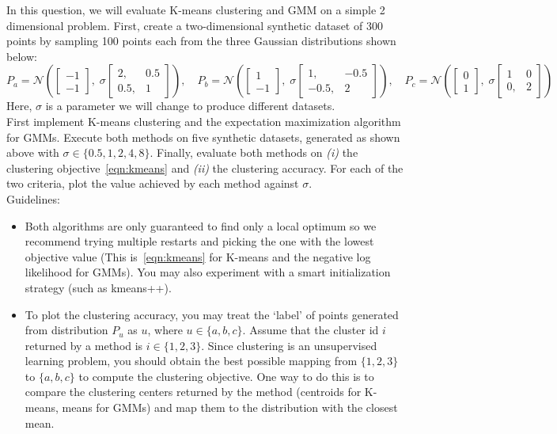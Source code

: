 \documentclass[a4paper]{article}
\newcounter{thm}
\newcommand{\Ncal}{\mathcal{N}}
\theoremstyle{definition}
\begin{document}
In this question, we will evaluate
K-means clustering and GMM on a simple 2 dimensional problem.
First, create a two-dimensional synthetic dataset of 300 points by sampling 100 points each from the
three Gaussian distributions shown below:
\[
P_a = \Ncal\left(
\begin{bmatrix}
-1 \\ -1
\end{bmatrix},
\;
\sigma\begin{bmatrix}
2, &0.5 \\ 0.5, &1
\end{bmatrix}
\right),
\quad
P_b = \Ncal\left(
\begin{bmatrix}
1 \\ -1
\end{bmatrix},
\;
 \sigma\begin{bmatrix}
1, &-0.5 \\ -0.5, &2
\end{bmatrix}
\right),
\quad
P_c = \Ncal\left(
\begin{bmatrix}
0 \\ 1
\end{bmatrix},
\;
 \sigma\begin{bmatrix}
1 &0 \\ 0, &2
\end{bmatrix}
\right)
\]
Here, $\sigma$ is a parameter we will change to produce different datasets.\\

First implement K-means clustering and the expectation maximization algorithm for GMMs.
Execute both methods on five synthetic datasets,
generated as shown above with $\sigma \in \{0.5, 1, 2, 4, 8\}$. Finally, evaluate both methods on \emph{(i)} the clustering objective~\eqref{eqn:kmeans} and \emph{(ii)}  the clustering accuracy. For each of the two criteria, plot the value achieved by each method against $\sigma$.\\


Guidelines:
\begin{itemize} 
\item Both algorithms are only guaranteed to find only a local optimum so we recommend trying multiple
restarts and picking the one with the lowest objective value (This is~\eqref{eqn:kmeans} for K-means and the negative log likelihood for GMMs).
You may also experiment with a smart initialization
strategy (such as kmeans++).

\item
To plot the clustering accuracy,  you may treat the `label' of points generated from distribution
$P_u$ as $u$, where $u\in \{a, b, c\}$.
Assume that the cluster id $i$ returned by a method is $i\in \{1, 2, 3\}$.
Since clustering is an unsupervised learning problem, you should obtain the best possible mapping
from $\{1, 2, 3\}$ to $\{a, b, c\}$ to compute the clustering objective.
One way to do this is to compare the clustering centers returned by the method (centroids for
K-means, means for GMMs) and map them to the distribution with the closest mean.

\end{itemize}
\end{document}

